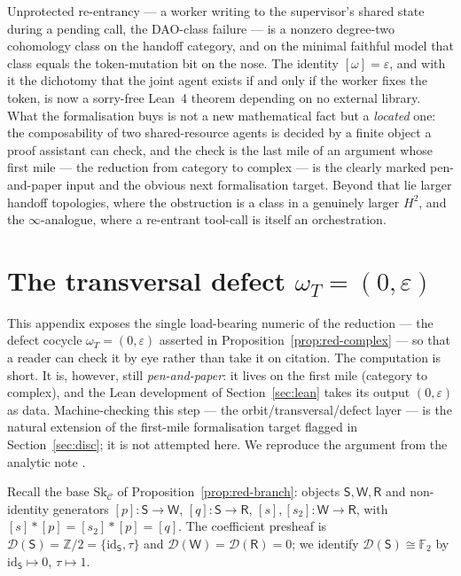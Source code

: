 \documentclass[11pt]{amsart}
\theoremstyle{definition}
\theoremstyle{remark}
\newcommand{\id}{\mathrm{id}}
\newcommand{\C}{\mathcal{C}}
\newcommand{\Sk}{\mathrm{Sk}}
\newcommand{\Sup}{\mathsf{S}}
\newcommand{\Wk}{\mathsf{W}}
\newcommand{\Rt}{\mathsf{R}}
\newcommand{\dir}{\mathcal{D}}
\newcommand{\FF}{\mathbb{F}_2}
\begin{document}
Unprotected re-entrancy --- a worker writing to the supervisor's shared state during a pending call, the
DAO-class failure --- is a nonzero degree-two cohomology class on the handoff category, and on the
minimal faithful model that class equals the token-mutation bit on the nose. The identity
$[\omega]=\varepsilon$, and with it the dichotomy that the joint agent exists if and only if the worker
fixes the token, is now a sorry-free Lean~4 theorem depending on no external library. What the
formalisation buys is not a new mathematical fact but a \emph{located} one: the composability of two
shared-resource agents is decided by a finite object a proof assistant can check, and the check is the
last mile of an argument whose first mile --- the reduction from category to complex --- is the clearly
marked pen-and-paper input and the obvious next formalisation target. Beyond that lie larger handoff
topologies, where the obstruction is a class in a genuinely larger $H^2$, and the $\infty$-analogue,
where a re-entrant tool-call is itself an orchestration.

\appendix

\section{The transversal defect \texorpdfstring{$\omega_T=(0,\varepsilon)$}{omega_T=(0,e)}}
\label{app:defect}

This appendix exposes the single load-bearing numeric of the reduction --- the defect cocycle
$\omega_T=(0,\varepsilon)$ asserted in Proposition~\ref{prop:red-complex} --- so that a reader can
check it by eye rather than take it on citation. The computation is short. It is, however, still
\emph{pen-and-paper}: it lives on the first mile (category to complex), and the Lean development of
Section~\ref{sec:lean} takes its output $(0,\varepsilon)$ as data. Machine-checking this step ---
the orbit/transversal/defect layer --- is the natural extension of the first-mile formalisation
target flagged in Section~\ref{sec:disc}; it is not attempted here. We reproduce the argument from
the analytic note \cite{analytic}.

Recall the base $\Sk_\C$ of Proposition~\ref{prop:red-branch}: objects $\Sup,\Wk,\Rt$ and
non-identity generators $[p]:\Sup\to\Wk$, $[q]:\Sup\to\Rt$, $[s],[s_2]:\Wk\to\Rt$, with
$[s]\ast[p]=[s_2]\ast[p]=[q]$. The coefficient presheaf is $\dir(\Sup)=\mathbb Z/2=\{\id_\Sup,\tau\}$
and $\dir(\Wk)=\dir(\Rt)=0$; we identify $\dir(\Sup)\cong\FF$ by $\id_\Sup\mapsto0$, $\tau\mapsto1$.
\end{document}

